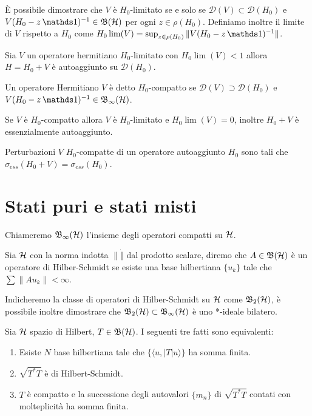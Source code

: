 È possibile dimostrare che $V$ è $H_0$-limitato se e solo se $\mathcal{D}(V) \subset \mathcal{D}(H_0)$ e $V(H_0 -z \un)^{-1}\in \B$ per ogni $z \in \rho(H_0)$. Definiamo inoltre il limite di $V$ rispetto a $H_0$ come $H_0\lim(V) = \sup_{z \in \rho(H_0)} \| V(H_0 -z \un)^{-1}\|$.

\begin{theorem}
    Sia $V$ un operatore hermitiano $H_0$-limitato con $H_0\lim(V)< 1$ allora $H = H_0 + V$ è autoaggiunto su $\mathcal{D}(H_0)$.
\end{theorem}

\begin{definition}
    Un operatore Hermitiano $V$ è detto $H_0$-compatto se $\mathcal{D}(V) \supset \mathcal{D}(H_0)$ e $V(H_0 -z \un)^{-1}\in \Bo$.
\end{definition}

Se $V$ è $H_0$-compatto allora $V$ è $H_0$-limitato e $H_0\lim(V) = 0$, inoltre $H_0 + V$ è essenzialmente autoaggiunto.

\begin{theorem}[Weyl]
    Perturbazioni $V$ $H_0$-compatte di un operatore autoaggiunto $H_0$ sono tali che $\sigma_{ess}(H_0 + V) = \sigma_{ess}(H_0)$.
\end{theorem}

\section{Stati puri e stati misti}
Chiameremo $\operatorname{\mathfrak{B}_\infty(\mathcal{H})}$ l'insieme degli operatori compatti su $\operatorname{\mathcal{H}}$.

\begin{definition}
    Sia $\operatorname{\mathcal{H}}$ con la norma indotta $\| \dot \|$ dal prodotto scalare, diremo che $A \in \operatorname{\mathfrak{B}(\mathcal{H})}$ è un operatore di Hilber-Schmidt se esiste una base hilbertiana $\{ u_k\}$ tale che $\sum \|Au_k \|<\infty$. 
\end{definition}

Indicheremo la classe di operatori di Hilber-Schmidt su $\operatorname{\mathcal{H}}$ come $\operatorname{\mathfrak{B}_2(\mathcal{H})}$, è possibile inoltre dimostrare che $\operatorname{\mathfrak{B}_2(\mathcal{H})} \subset \operatorname{\mathfrak{B}_\infty(\mathcal{H})}$ è uno *-ideale bilatero.

\begin{proposition}
    Sia $\operatorname{\mathcal{H}}$ spazio di Hilbert, $T\in \operatorname{\mathfrak{B}(\mathcal{H})}$. I seguenti tre fatti sono equivalenti:
\begin{enumerate}
    \item Esiste $N$ base hilbertiana tale che $\{ \langle u, |T| u \rangle \}$ ha somma finita.
    \item $\sqrt{T^*T}$ è di Hilbert-Schmidt.
    \item $T$ è compatto e la successione degli autovalori $\{m_n\}$ di $\sqrt{T^*T}$ contati con molteplicità ha somma finita. 
\end{enumerate}
\end{proposition}

